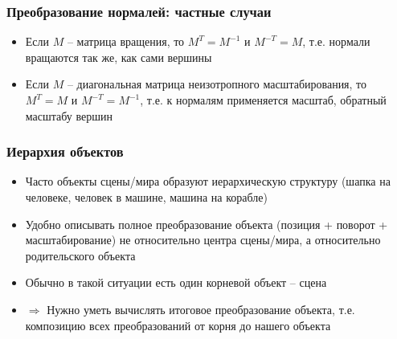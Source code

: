 \documentclass[10pt]{beamer}
\begin{document}
\begin{frame}[fragile]
\frametitle{Преобразование нормалей: частные случаи}
\begin{itemize}
\item Если \begin{math}M\end{math} -- матрица вращения, то \begin{math}M^T = M^{-1}\end{math} и \begin{math}M^{-T}=M\end{math}, т.е. нормали вращаются так же, как сами вершины
\pause
\item Если \begin{math}M\end{math} -- диагональная матрица неизотропного масштабирования, то \begin{math}M^T = M\end{math} и \begin{math}M^{-T}=M^{-1}\end{math}, т.е. к нормалям применяется масштаб, обратный масштабу вершин 
\end{itemize}
\end{frame}

\begin{frame}[fragile]
\frametitle{Иерархия объектов}
\begin{itemize}
\item Часто объекты сцены/мира образуют иерархическую структуру (шапка на человеке, человек в машине, машина на корабле)
\pause
\item Удобно описывать полное преобразование объекта (позиция + поворот + масштабирование) не относительно центра сцены/мира, а относительно родительского объекта
\pause
\item Обычно в такой ситуации есть один корневой объект -- сцена
\pause
\item \begin{math}\Longrightarrow\end{math} Нужно уметь вычислять итоговое преобразование объекта, т.е. композицию всех преобразований от корня до нашего объекта
\end{itemize}
\end{frame}
\end{document}
